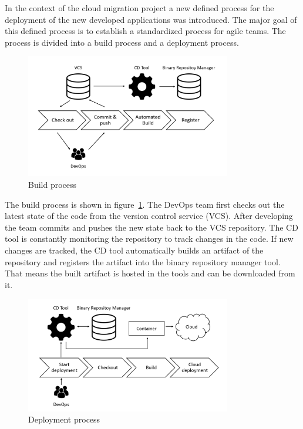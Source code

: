 In the context of the cloud migration project a new defined process for the deployment of the new developed applications was introduced. The major goal of this defined process is to establish a standardized process for agile teams. The process is divided into a build process and a deployment process.

\begin{figure}[htpb]
  \centering
  \includegraphics[width=0.8\textwidth]{figures/build-process.PNG}
  \caption{ Build process}
  \label{fig:Build-process}
\end{figure}

The build process is shown in figure~\ref{fig:Build-process}. The DevOps team first checks out the latest state of the code from the version control service (VCS). After developing the team commits and pushes the new state back to the VCS repository. The CD tool is constantly monitoring the repository to track changes in the code. If new changes are tracked, the CD tool automatically builds an artifact of the repository and registers the artifact into the binary repository manager tool. That means the built artifact is hosted in the tools and can be downloaded from it.

\begin{figure}[htpb]
  \centering
  \includegraphics[width=0.8\textwidth]{figures/deployment-process.PNG}
  \caption{ Deployment process}
  \label{fig:Deployment-process}
\end{figure}

